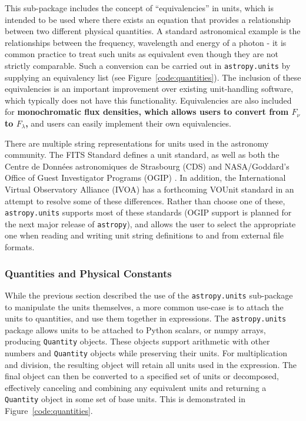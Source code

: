 \documentclass[traditabstract]{aa}
\newcommand{\astropy}{\texttt{astropy}\xspace}
\begin{document}
This sub-package includes the concept of ``equivalencies'' in units, which is
intended to be used where there exists an equation that provides a relationship
between two different physical quantities. A standard astronomical example is the
relationships between the frequency, wavelength and energy of a photon - it is
common practice to treat such units as equivalent even though they are not
strictly comparable. Such a conversion can be carried out in \texttt{astropy.units} by supplying an equivalency list
(see Figure~\ref{code:quantities}). The inclusion of these equivalencies is an important
improvement over existing unit-handling software, which typically does not
have this functionality. Equivalencies are also included for
\textbf{monochromatic flux densities, which allows users to convert from
$F_\nu$ to $F_\lambda$,} and users can easily implement their own
equivalencies.

There are multiple string representations for units used in the astronomy
community. The FITS Standard \citep{fits3} defines a unit standard, as well
as both the Centre de Donn\'ees astronomiques de Strasbourg (CDS)
\citep{ochsenbein2000cds} and NASA/Goddard's Office of Guest Investigator
Programs (OGIP) \citep{george1995ogip}. In addition, the International Virtual
Observatory Alliance (IVOA) has a forthcoming VOUnit standard
\citep{derriere2012vounit} in an attempt to resolve some of these differences.
Rather than choose one of these, \texttt{astropy.units} supports most of these
standards (OGIP support is planned for the next major release of \astropy),
and allows the user to select the appropriate one when reading and writing unit
string definitions to and from external file formats.

\subsubsection{Quantities and Physical Constants}

\label{sec:quantities}

While the previous section described the use of the \texttt{astropy.units} sub-package to manipulate
the units themselves, a more common use-case is to attach the units to
quantities, and use them together in expressions. The \texttt{astropy.units}
package allows units to be attached to Python scalars, or \gls{numpy} arrays,
producing \texttt{Quantity} objects. These objects support arithmetic with
other numbers and \texttt{Quantity} objects while preserving their units. For
multiplication and division, the resulting object will retain all units used in
the expression. The final object can then be converted to a specified set of
units or decomposed, effectively canceling and combining any equivalent units
and returning a \texttt{Quantity} object in some set of base units. This is
demonstrated in Figure~\ref{code:quantities}.
\end{document}
